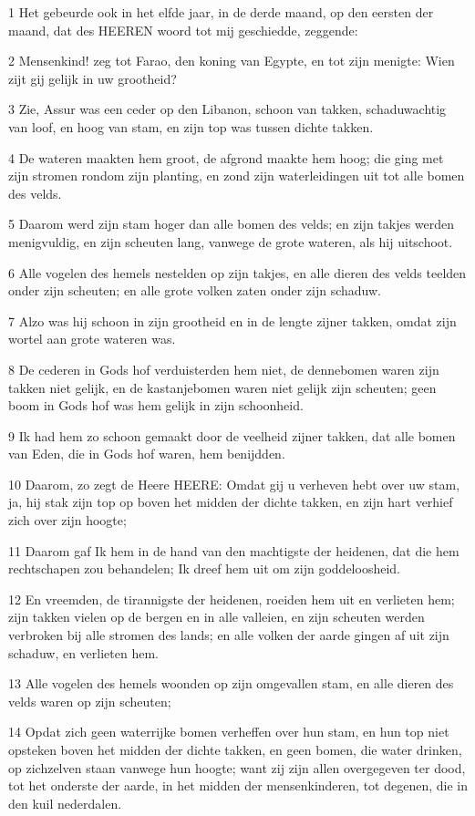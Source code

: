 \par 1 Het gebeurde ook in het elfde jaar, in de derde maand, op den eersten der maand, dat des HEEREN woord tot mij geschiedde, zeggende:
\par 2 Mensenkind! zeg tot Farao, den koning van Egypte, en tot zijn menigte: Wien zijt gij gelijk in uw grootheid?
\par 3 Zie, Assur was een ceder op den Libanon, schoon van takken, schaduwachtig van loof, en hoog van stam, en zijn top was tussen dichte takken.
\par 4 De wateren maakten hem groot, de afgrond maakte hem hoog; die ging met zijn stromen rondom zijn planting, en zond zijn waterleidingen uit tot alle bomen des velds.
\par 5 Daarom werd zijn stam hoger dan alle bomen des velds; en zijn takjes werden menigvuldig, en zijn scheuten lang, vanwege de grote wateren, als hij uitschoot.
\par 6 Alle vogelen des hemels nestelden op zijn takjes, en alle dieren des velds teelden onder zijn scheuten; en alle grote volken zaten onder zijn schaduw.
\par 7 Alzo was hij schoon in zijn grootheid en in de lengte zijner takken, omdat zijn wortel aan grote wateren was.
\par 8 De cederen in Gods hof verduisterden hem niet, de dennebomen waren zijn takken niet gelijk, en de kastanjebomen waren niet gelijk zijn scheuten; geen boom in Gods hof was hem gelijk in zijn schoonheid.
\par 9 Ik had hem zo schoon gemaakt door de veelheid zijner takken, dat alle bomen van Eden, die in Gods hof waren, hem benijdden.
\par 10 Daarom, zo zegt de Heere HEERE: Omdat gij u verheven hebt over uw stam, ja, hij stak zijn top op boven het midden der dichte takken, en zijn hart verhief zich over zijn hoogte;
\par 11 Daarom gaf Ik hem in de hand van den machtigste der heidenen, dat die hem rechtschapen zou behandelen; Ik dreef hem uit om zijn goddeloosheid.
\par 12 En vreemden, de tirannigste der heidenen, roeiden hem uit en verlieten hem; zijn takken vielen op de bergen en in alle valleien, en zijn scheuten werden verbroken bij alle stromen des lands; en alle volken der aarde gingen af uit zijn schaduw, en verlieten hem.
\par 13 Alle vogelen des hemels woonden op zijn omgevallen stam, en alle dieren des velds waren op zijn scheuten;
\par 14 Opdat zich geen waterrijke bomen verheffen over hun stam, en hun top niet opsteken boven het midden der dichte takken, en geen bomen, die water drinken, op zichzelven staan vanwege hun hoogte; want zij zijn allen overgegeven ter dood, tot het onderste der aarde, in het midden der mensenkinderen, tot degenen, die in den kuil nederdalen.
